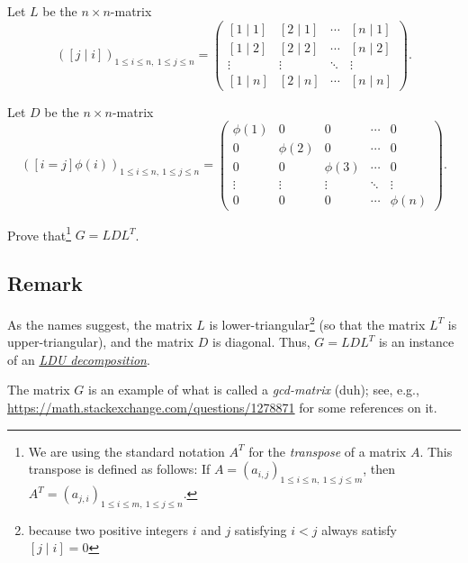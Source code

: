 \documentclass[paper=a4, fontsize=12pt]{scrartcl}%
\theoremstyle{plainsl}
\theoremstyle{definition}
\theoremstyle{remark}
\begin{document}
Let $L$ be the $n \times n$-matrix
\[
\left(  \left[  j \mid i \right]  \right)  _{1 \leq i \leq n, \ 1 \leq j \leq
n } =
\begin{pmatrix}
\left[  1 \mid1 \right]  & \left[  2 \mid1 \right]  & \cdots & \left[  n \mid1
\right] \\
\left[  1 \mid2 \right]  & \left[  2 \mid2 \right]  & \cdots & \left[  n \mid2
\right] \\
\vdots & \vdots & \ddots & \vdots\\
\left[  1 \mid n \right]  & \left[  2 \mid n \right]  & \cdots & \left[  n
\mid n \right]
\end{pmatrix}
.
\]


Let $D$ be the $n \times n$-matrix
\[
\left(  \left[  i = j \right]  \phi\left(  i \right)  \right)  _{1 \leq i \leq
n, \ 1 \leq j \leq n } =
\begin{pmatrix}
\phi\left(  1 \right)  & 0 & 0 & \cdots & 0\\
0 & \phi\left(  2 \right)  & 0 & \cdots & 0\\
0 & 0 & \phi\left(  3 \right)  & \cdots & 0\\
\vdots & \vdots & \vdots & \ddots & \vdots\\
0 & 0 & 0 & \cdots & \phi\left(  n \right)
\end{pmatrix}
.
\]


Prove that\footnote{We are using the standard notation $A^{T}$ for the
\textit{transpose} of a matrix $A$. This transpose is defined as follows: If
$A = \left(  a_{i, j} \right)  _{1 \leq i \leq n, \ 1 \leq j \leq m }$, then
$A^{T} = \left(  a_{j, i} \right)  _{1 \leq i \leq m, \ 1 \leq j \leq n }$.}
$G = LDL^{T}$.

\subsection{Remark}

As the names suggest, the matrix $L$ is lower-triangular\footnote{because two
positive integers $i$ and $j$ satisfying $i<j$ always satisfy $\left[  j\mid
i\right]  =0$} (so that the matrix $L^{T}$ is upper-triangular), and the
matrix $D$ is diagonal. Thus, $G=LDL^{T}$ is an instance of an
\href{https://en.wikipedia.org/wiki/LU_decomposition#LDU_decomposition}{\textit{LDU
decomposition}}.

The matrix $G$ is an example of what is called a \textit{gcd-matrix} (duh);
see, e.g., \url{https://math.stackexchange.com/questions/1278871} for some
references on it.
\end{document}
